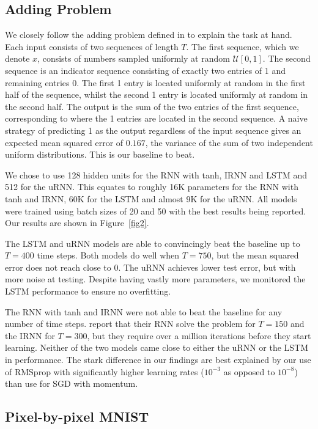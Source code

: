 \documentclass{article} %
\begin{document}
\subsection{Adding Problem}

We closely follow the adding problem defined in \cite{LSTM} to explain the task at hand.
Each input consists of two sequences of length $T$. 
The first sequence, which we denote $x$, consists of numbers sampled uniformly at random 
$\mathcal{U}[0,1]$. 
The second sequence is an indicator sequence consisting of exactly two entries of 1 and remaining entries 0.
The first 1 entry is located uniformly at random in the first half of the sequence, whilst the second 1
entry is located uniformly at random in the second half.
The output is the sum of the two entries of the first sequence, corresponding to where the 1 entries are
located in the second sequence. A naive strategy of predicting 1 as the output regardless of the input sequence gives an expected mean
squared error of $0.167$, the variance of the sum of two independent uniform distributions.
This is our baseline to beat.

We chose to use 128 hidden units for the RNN with tanh, IRNN and LSTM and 512 for the uRNN.
This equates to roughly 16K parameters for the RNN with tanh and IRNN, 60K for the LSTM and almost 9K for
the uRNN. All models were trained using batch sizes of 20 and 50 with the best results being reported.
Our results are shown in Figure~\ref{fig2}.

The LSTM and uRNN models are able to convincingly beat the baseline up to $T=400$ time steps.
Both models do well when $T=750$, but the mean squared error does not reach close to $0$.
The uRNN achieves lower test error, but with more noise at testing. Despite having vastly more parameters,
we monitored the LSTM performance to ensure no overfitting.

The RNN with tanh and IRNN were not able to beat the baseline for any number of time steps. 
\cite{Quoc2015} report that their RNN solve the problem for $T=150$ and the IRNN for $T=300$,
but they require over a million iterations before they start learning. 
Neither of the two models came close to either the uRNN or the LSTM in performance.
The stark difference in our findings are best explained by our use of RMSprop with significantly higher 
learning rates ($10^{-3}$ as opposed to $10^{-8}$) than \cite{Quoc2015} use for SGD with momentum.

\subsection{Pixel-by-pixel MNIST}
\end{document}
